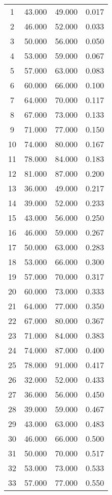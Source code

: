 % 
\begin{tabular}{cccc}
  \hline
  \hline
1 & 43.000 & 49.000 & 0.017 \\ 
  2 & 46.000 & 52.000 & 0.033 \\ 
  3 & 50.000 & 56.000 & 0.050 \\ 
  4 & 53.000 & 59.000 & 0.067 \\ 
  5 & 57.000 & 63.000 & 0.083 \\ 
  6 & 60.000 & 66.000 & 0.100 \\ 
  7 & 64.000 & 70.000 & 0.117 \\ 
  8 & 67.000 & 73.000 & 0.133 \\ 
  9 & 71.000 & 77.000 & 0.150 \\ 
  10 & 74.000 & 80.000 & 0.167 \\ 
  11 & 78.000 & 84.000 & 0.183 \\ 
  12 & 81.000 & 87.000 & 0.200 \\ 
  13 & 36.000 & 49.000 & 0.217 \\ 
  14 & 39.000 & 52.000 & 0.233 \\ 
  15 & 43.000 & 56.000 & 0.250 \\ 
  16 & 46.000 & 59.000 & 0.267 \\ 
  17 & 50.000 & 63.000 & 0.283 \\ 
  18 & 53.000 & 66.000 & 0.300 \\ 
  19 & 57.000 & 70.000 & 0.317 \\ 
  20 & 60.000 & 73.000 & 0.333 \\ 
  21 & 64.000 & 77.000 & 0.350 \\ 
  22 & 67.000 & 80.000 & 0.367 \\ 
  23 & 71.000 & 84.000 & 0.383 \\ 
  24 & 74.000 & 87.000 & 0.400 \\ 
  25 & 78.000 & 91.000 & 0.417 \\ 
  26 & 32.000 & 52.000 & 0.433 \\ 
  27 & 36.000 & 56.000 & 0.450 \\ 
  28 & 39.000 & 59.000 & 0.467 \\ 
  29 & 43.000 & 63.000 & 0.483 \\ 
  30 & 46.000 & 66.000 & 0.500 \\ 
  31 & 50.000 & 70.000 & 0.517 \\ 
  32 & 53.000 & 73.000 & 0.533 \\ 
  33 & 57.000 & 77.000 & 0.550 \\ 

\end{tabular}
